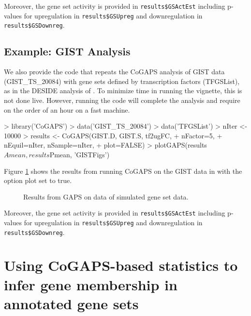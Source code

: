 \documentclass{report}
\begin{document}
\par Moreover, the gene set activity is provided in \texttt{results\$GSActEst} including p-values for upregulation in \texttt{results\$GSUpreg} and downregulation in \texttt{results\$GSDownreg}.

\subsection{Example: GIST Analysis}

\par We also provide the code that repeats the CoGAPS analysis of GIST data (GIST\_TS\_20084) with gene sets defined by transcription factors (TFGSList), as in the DESIDE analysis of \cite{Ochs2009}.  To minimize time in running the vignette, this is not done live.  However, running the code will complete the analysis and require on the order of an hour on a fast machine.

\begin{Schunk}
\begin{Sinput}
> library('CoGAPS')
> data('GIST_TS_20084')
> data('TFGSList')
> nIter <- 10000
> results <- CoGAPS(GIST.D, GIST.S, tf2ugFC,
+                   nFactor=5,
+                   nEquil=nIter, nSample=nIter,
+                   plot=FALSE)
> plotGAPS(results$Amean, results$Pmean, 'GISTFigs')
\end{Sinput}
\end{Schunk}

Figure \ref{fig:GS} shows the results from running CoGAPS on the GIST data in \cite{Ochs2009} with the option plot set to true.
\begin{figure}[ht]
\begin{center}
\end{center}
\caption{Results from GAPS on data of simulated gene set data.}
\label{fig:GS}
\end{figure}

\par Moreover, the gene set activity is provided in \texttt{results\$GSActEst} including p-values for upregulation in \texttt{results\$GSUpreg} and downregulation in \texttt{results\$GSDownreg}.

\section{Using CoGAPS-based statistics to infer gene membership in annotated gene sets}
\end{document}
